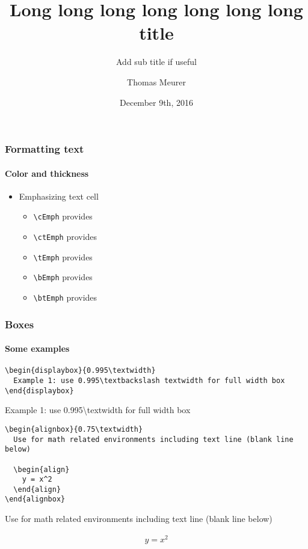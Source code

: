 \documentclass[10pt,t,aspectratio=1610]{beamer}
\title{Long long long long long long long title}
\subtitle{Add sub title if useful}
\author[T. Meurer]{Thomas Meurer}
\institute[ACON]{Meeting Name, Place (Country)}
\date{December 9th, 2016}
\begin{document}

\begin{frame}[plain]
  \titlepage
\end{frame}


\begin{frame}
  \frametitle{Formatting text}
  \framesubtitle{Color and thickness}

  \begin{itemize}
  \item Emphasizing text  cell
    \begin{itemize}
    \item \texttt{\textbackslash cEmph} provides 
    \item \texttt{\textbackslash ctEmph} provides 
    \item \texttt{\textbackslash tEmph} provides 
    \item \texttt{\textbackslash bEmph} provides 
    \item \texttt{\textbackslash btEmph} provides 
    \end{itemize}
  \end{itemize}
\end{frame}


\begin{frame}[fragile]
  \frametitle{Boxes}
  \framesubtitle{Some examples}

\begin{verbatim}
\begin{displaybox}{0.995\textwidth}
  Example 1: use 0.995\textbackslash textwidth for full width box
\end{displaybox}
\end{verbatim}

  \begin{displaybox}{0.995\textwidth}
    Example 1: use 0.995\textbackslash textwidth for full width box
  \end{displaybox}

\begin{verbatim}
\begin{alignbox}{0.75\textwidth}
  Use for math related environments including text line (blank line below)

  \begin{align}
    y = x^2
  \end{align}
\end{alignbox}
\end{verbatim}

  \begin{alignbox}{0.75\textwidth}
    Use for math related environments including text line (blank line below)

    \begin{align}
      y = x^2
    \end{align}
  \end{alignbox}
\end{frame}
\end{document}
